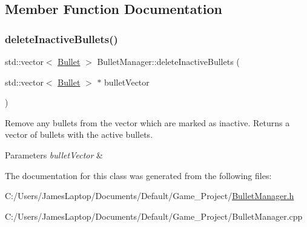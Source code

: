 \subsection{Member Function Documentation}
\mbox{\label{class_bullet_manager_a834ec287e01fc2ed7c5d3885e4b380c6}} 
\subsubsection{\texorpdfstring{delete\+Inactive\+Bullets()}{deleteInactiveBullets()}}
{\footnotesize\ttfamily std\+::vector$<$ \hyperlink{class_bullet}{Bullet} $>$ Bullet\+Manager\+::delete\+Inactive\+Bullets (\begin{DoxyParamCaption}\item[{std\+::vector$<$ \hyperlink{class_bullet}{Bullet} $>$ $\ast$}]{bullet\+Vector }\end{DoxyParamCaption})}



Remove any bullets from the vector which are marked as inactive. Returns a vector of bullets with the active bullets. 


\begin{DoxyParams}{Parameters}
{\em bullet\+Vector} & \\
\hline
\end{DoxyParams}


The documentation for this class was generated from the following files\+:\begin{DoxyCompactItemize}
\item 
C\+:/\+Users/\+James\+Laptop/\+Documents/\+Default/\+Game\+\_\+\+Project/\hyperlink{_bullet_manager_8h}{Bullet\+Manager.\+h}\item 
C\+:/\+Users/\+James\+Laptop/\+Documents/\+Default/\+Game\+\_\+\+Project/Bullet\+Manager.\+cpp\end{DoxyCompactItemize}

